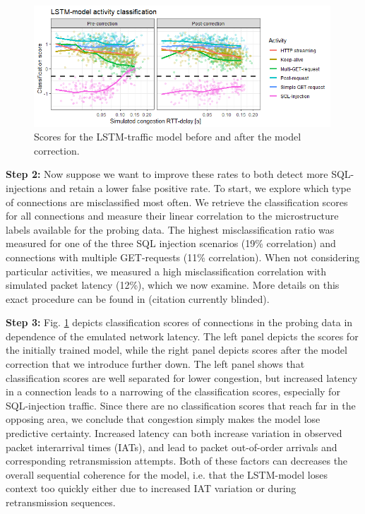 \documentclass[runningheads]{llncs}
\begin{document}
\begin{figure}
\centering
\includegraphics[width=0.99\textwidth]{images/LSTM_classi.png}
\caption{Scores for the LSTM-traffic model before and after the model correction.}\label{fig:LSTM_exp}
\end{figure}


\textbf{Step 2:} Now suppose we want to improve these rates to both detect more SQL-injections and retain a lower false positive rate. To start, we explore which type of connections are misclassified most often. We retrieve the classification scores for all connections and measure their linear correlation to the microstructure labels available for the probing data. The highest misclassification ratio was measured for one of the three SQL injection scenarios  (19\% correlation) and connections with multiple GET-requests (11\% correlation). When not considering particular activities, we measured a high misclassification correlation with simulated packet latency (12\%), which we now examine. More details on this exact procedure can be found in (citation currently blinded).



\textbf{Step 3:} Fig. \ref{fig:LSTM_exp} depicts classification scores of connections in the probing data in dependence of the emulated network latency. The left panel depicts the scores for the initially trained model, while the right panel depicts scores after the model correction that we introduce further down. 
The left panel shows that classification scores are well separated for lower congestion, but increased latency in a connection leads to a narrowing of the classification scores, especially for SQL-injection traffic. Since there are no classification scores that reach far in the opposing area, we conclude that congestion simply makes the model lose predictive certainty. 
Increased latency can both increase variation in observed packet interarrival times (IATs), and lead to packet out-of-order arrivals and corresponding retransmission attempts. Both of these factors can decreases the overall sequential coherence for the model, i.e. that the LSTM-model loses context too quickly either due to increased IAT variation or during retransmission sequences. 
\end{document}
